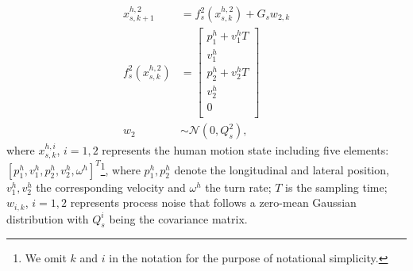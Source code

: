 \documentclass[journal]{IEEEtran}
\begin{document}
    \begin{subequations} \label{eqn:uniform_model}
		\begin{align}
			x_{s,k+1}^{h,2}&= f_s^2(x_{s,k}^{h,2})+G_sw_{2,k} \label{eqn:h_d_dyn}\\
f_s^2(x_{s,k}^{h,2})&=\left[
			\begin{array}{c}
				p^h_1+v^h_1T\\
				v^h_1\\
				p^h_2+v^h_2T\\
				v^h_2\\
				0\\ 
			\end{array}\right] \\            
			w_2&\sim\mathcal{N}(0,Q^2_s),
		\end{align}
	\end{subequations}\normalsize
	where $x_{s,k}^{h,i}$, $i=1,2$ represents the human motion state including five elements: $\left[p^h_1,v^h_1,p^h_2,v^h_2,\omega^h\right]^T$\footnote{We omit $k$ and $i$ in the notation for the purpose of notational simplicity.}, where $p^h_1,p^h_2$ denote the longitudinal and lateral position, $v^h_1,v^h_2$ the corresponding velocity and $\omega^h$ the turn rate; $T$ is the sampling time; $w_{i,k}$, $i=1,2$ represents process noise that follows a zero-mean Gaussian distribution with $Q^i_s$ being the covariance matrix.
	
\end{document}
